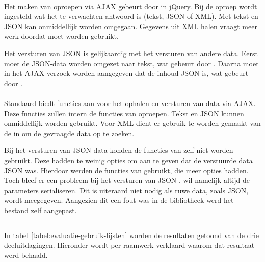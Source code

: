 \paragraph{\jqm}
Het maken van oproepen via AJAX gebeurt door  in jQuery. 
Bij de oproep wordt ingesteld wat het te verwachten antwoord is (tekst, JSON of XML). 
Met tekst en JSON kan onmiddellijk worden omgegaan.
Gegevens uit XML halen vraagt meer werk doordat  moet worden gebruikt.

Het versturen van JSON is gelijkaardig met het versturen van andere data.
Eerst moet de JSON-data worden omgezet naar tekst, wat gebeurt door .
Daarna moet in het AJAX-verzoek worden aangegeven dat de inhoud JSON is, wat gebeurt door .

\paragraph{\lungo}
Standaard biedt \lungo{} functies aan voor het ophalen en versturen van data via AJAX.
Deze functies zullen intern de functies van \quo{} oproepen.
Tekst en JSON kunnen onmiddellijk worden gebruikt.
Voor XML dient er gebruik te worden gemaakt van de  in \quo{} om de gevraagde data op te zoeken.

Bij het versturen van JSON-data konden de functies van \lungo{} zelf niet worden gebruikt.
Deze hadden te weinig opties om aan te geven dat de verstuurde data JSON was.
Hierdoor werden de functies van \quo{} gebruikt, die meer opties hadden.
Toch bleef er een probleem bij het versturen van JSON-.
\quo{} wil namelijk altijd de parameters serialiseren.
Dit is uiteraard niet nodig als ruwe data, zoals JSON, wordt meegegeven.
Aangezien dit een fout was in de bibliotheek werd het \js-bestand zelf aangepast.


\subsection{}
\label{sec:evaluatie-gebruik-lijsten}

In tabel \ref{tabel:evaluatie-gebruik-lijsten} worden de resultaten getoond van de drie deeluitdagingen.
Hieronder wordt per raamwerk verklaard waarom dat resultaat werd behaald.

